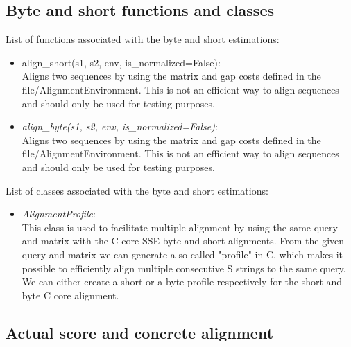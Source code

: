 \documentclass[12pt]{article}
\begin{document}
\subsection{Byte and short functions and classes}
List of functions associated with the byte and short estimations:
\begin{itemize}
	\item {align\_short(s1, s2, env, is\_normalized=False)}:\\
    Aligns two sequences by using the matrix and gap costs defined in the file/AlignmentEnvironment.
    This is not an efficient way to align
    sequences and should only be used for testing purposes.
	\item \emph{align\_byte(s1, s2, env, is\_normalized=False)}:\\
    Aligns two sequences by using the matrix and gap costs defined in the file/AlignmentEnvironment.
    This is not an efficient way to align
    sequences and should only be used for testing purposes.
	
\end{itemize}
List of classes associated with the byte and short estimations:
\begin{itemize}
	\item \emph{AlignmentProfile}:\\
	This class is used to facilitate multiple alignment by using the same query and matrix with the C core SSE byte and
    short alignments. From the given query and matrix we can generate a so-called "profile" in C, which makes it
    possible to efficiently align multiple consecutive S strings to the same query. We can either create a short or a
    byte profile respectively for the short and byte C core alignment.
\end{itemize}
\subsection{Actual score and concrete alignment}
\end{document}
